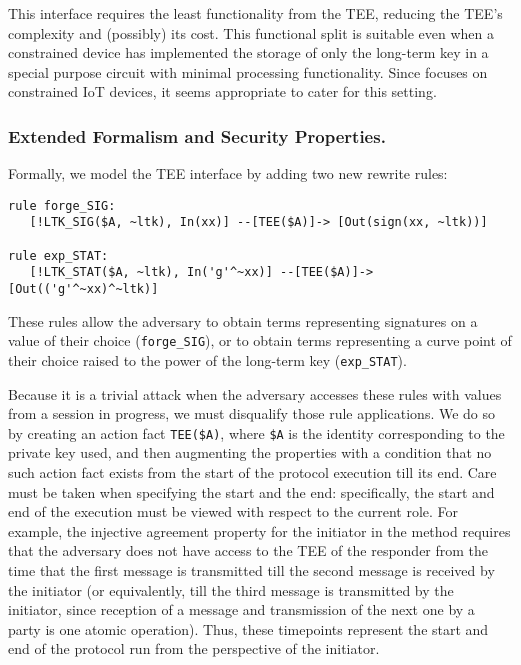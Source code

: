 \documentclass[runningheads]{llncs}
\begin{document}
%
This interface requires the least functionality from the TEE, reducing the 
TEE's complexity and (possibly) its cost.
%
This functional split is suitable even when a constrained device has
implemented the storage of only the long-term key in 
a special purpose circuit with minimal processing functionality.
%
Since \mEdhoc{} focuses on constrained IoT devices, it seems appropriate to
cater for this setting.
%

\subsubsection{Extended Formalism and Security Properties.}
\label{sec:TEE:fmAndProps}
Formally, we model the TEE interface by adding two new rewrite rules:
%
\begin{small}
\begin{verbatim}
rule forge_SIG:
   [!LTK_SIG($A, ~ltk), In(xx)] --[TEE($A)]-> [Out(sign(xx, ~ltk))]

rule exp_STAT:
   [!LTK_STAT($A, ~ltk), In('g'^~xx)] --[TEE($A)]-> [Out(('g'^~xx)^~ltk)]
\end{verbatim}
\end{small}
%
These rules allow the adversary to obtain terms representing signatures on a
value of their choice (\verb|forge_SIG|), or to obtain terms
representing a curve point of their choice raised to the power of the
long-term key (\verb|exp_STAT|).
%

Because it is a trivial attack when the adversary accesses these rules with values
from a session in progress, we must disqualify those rule applications.
%
We do so by creating an action fact \verb|TEE($A)|, where \verb|$A| is the
identity corresponding to the private key used, and then augmenting the
properties with a condition that no such action fact exists from the start of
the protocol execution till its end.
%
Care must be taken when specifying the start and the end: specifically,
the start and end of the execution must be viewed with respect to the current
role.
%
For example, the injective agreement property for the initiator in
the \mSigSig{} method requires that the adversary does not have access to the
TEE of the responder from the time that the first message is transmitted till
the second message is received by the initiator (or equivalently, till the third message is transmitted by the initiator, since reception of a message and transmission of the next one by a party is one atomic operation).
%
Thus, these timepoints represent the start and end of the
protocol run from the perspective of the initiator.
%
\end{document}
